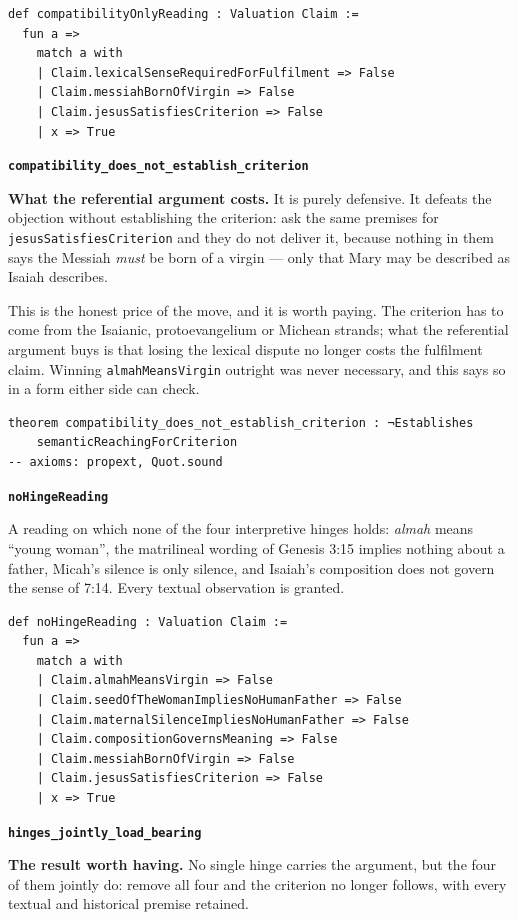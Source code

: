 \documentclass[11pt]{article}
\begin{document}
{\small\begin{verbatim}
def compatibilityOnlyReading : Valuation Claim :=
  fun a =>
    match a with
    | Claim.lexicalSenseRequiredForFulfilment => False
    | Claim.messiahBornOfVirgin => False
    | Claim.jesusSatisfiesCriterion => False
    | x => True
\end{verbatim}}
\par\medskip\noindent\textbf{\texttt{compatibility\_\allowbreak{}does\_\allowbreak{}not\_\allowbreak{}establish\_\allowbreak{}criterion}}\par\nobreak\noindent
\textbf{What the referential argument costs.} It is purely defensive. It defeats the objection without establishing the criterion: ask the same premises for \texttt{jesus\allowbreak{}Satisfies\allowbreak{}Criterion} and they do not deliver it, because nothing in them says the Messiah \emph{must} be born of a virgin — only that Mary may be described as Isaiah describes.

This is the honest price of the move, and it is worth paying. The criterion has to come from the Isaianic, protoevangelium or Michean strands; what the referential argument buys is that losing the lexical dispute no longer costs the fulfilment claim. Winning \texttt{almah\allowbreak{}Means\allowbreak{}Virgin} outright was never necessary, and this says so in a form either side can check.

{\small\begin{verbatim}
theorem compatibility_does_not_establish_criterion : ¬Establishes
    semanticReachingForCriterion
-- axioms: propext, Quot.sound
\end{verbatim}}
\par\medskip\noindent\textbf{\texttt{no\allowbreak{}Hinge\allowbreak{}Reading}}\par\nobreak\noindent
A reading on which none of the four interpretive hinges holds: \emph{almah} means “young woman”, the matrilineal wording of Genesis 3:15 implies nothing about a father, Micah’s silence is only silence, and Isaiah’s composition does not govern the sense of 7:14. Every textual observation is granted.

{\small\begin{verbatim}
def noHingeReading : Valuation Claim :=
  fun a =>
    match a with
    | Claim.almahMeansVirgin => False
    | Claim.seedOfTheWomanImpliesNoHumanFather => False
    | Claim.maternalSilenceImpliesNoHumanFather => False
    | Claim.compositionGovernsMeaning => False
    | Claim.messiahBornOfVirgin => False
    | Claim.jesusSatisfiesCriterion => False
    | x => True
\end{verbatim}}
\par\medskip\noindent\textbf{\texttt{hinges\_\allowbreak{}jointly\_\allowbreak{}load\_\allowbreak{}bearing}}\par\nobreak\noindent
\textbf{The result worth having.} No single hinge carries the argument, but the four of them jointly do: remove all four and the criterion no longer follows, with every textual and historical premise retained.
\end{document}
